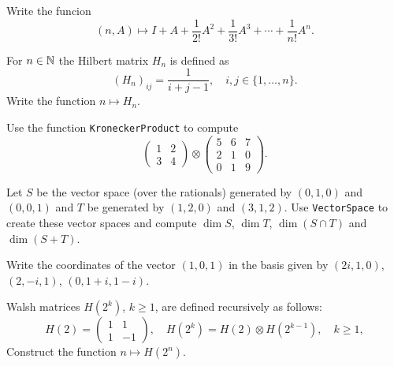 \begin{prob}
    Write the funcion
    \[
    (n,A)\mapsto I+A+\frac{1}{2!}A^2+\frac{1}{3!}A^3+\cdots+\frac{1}{n!}A^{n}.
    \]
\end{prob}

\begin{prob}
  For $n\in\mathbb{N}$ the Hilbert matrix $H_n$ is defined as 
  \[
    (H_n)_{ij}=\frac{1}{i+j-1},\quad i,j\in\{1,\dots,n\}.
  \]
  Write the function $n\mapsto H_n$.
\end{prob}

\begin{prob}
  Use the function \lstinline{KroneckerProduct} to 
  compute
  \[
    \begin{pmatrix}
      1 & 2\\
      3 & 4
    \end{pmatrix}
    \otimes
    \begin{pmatrix}
      5 & 6 & 7\\
      2 & 1 & 0\\
      0 & 1 & 9
    \end{pmatrix}.
  \]
\end{prob}


\begin{prob}
	\label{prob:vsQ}
	Let $S$ be the vector space (over the rationals) generated by $(0,1,0)$ and
	$(0,0,1)$ and $T$ be generated by $(1,2,0)$ and $(3,1,2)$. Use
	\lstinline{VectorSpace} to create these vector spaces and compute $\dim S$,
	$\dim T$, $\dim(S\cap T)$ and $\dim(S+T)$.
\end{prob}

\begin{prob}
	\label{prob:withE(4)}
	Write the coordinates of the vector $(1,0,1)$ in the basis given by
	$(2i,1,0)$, $(2,-i,1)$, $(0,1+i,1-i)$. 
\end{prob}

\begin{prob}
  Walsh matrices $H(2^k)$, $k\geq1$, are defined recursively as follows:
  \[
    H(2)=\begin{pmatrix}
      1 & 1\\
      1 & -1
    \end{pmatrix}
    ,\quad
    H(2^k)=H(2)\otimes H(2^{k-1}),\quad k\geq1,
  \]
  Construct the function $n\mapsto
  H(2^n)$. 
\end{prob}

